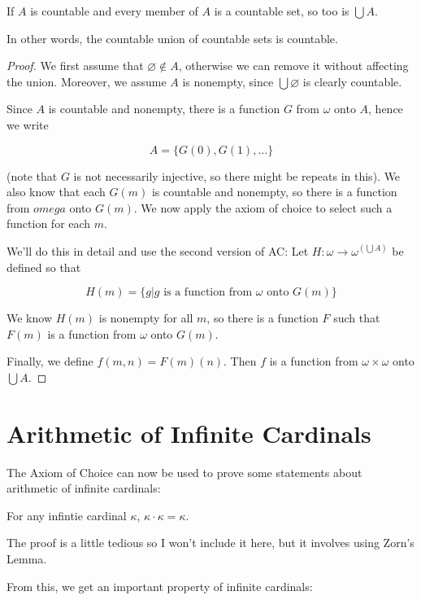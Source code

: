 \begin{theorem}
    If $A$ is countable and every member of $A$ is a countable set, so too is $\bigcup A$.

    In other words, the countable union of countable sets is countable. 
\end{theorem}

\begin{proof}
    We first assume that $\varnothing \notin A$, otherwise we can remove it without affecting the union. Moreover, we assume $A$ is nonempty, since $\bigcup \varnothing$ is clearly countable. 

    Since $A$ is countable and nonempty, there is a function $G$ from $\omega$ onto $A$, hence we write 

    \[A = \{G(0), G(1), \ldots\}\]

    (note that $G$ is not necessarily injective, so there might be repeats in this). We also know that each $G(m)$ is countable and nonempty, so there is a function from $omega$ onto $G(m)$. We now apply the axiom of choice to select such a function for each $m$. 

    We'll do this in detail and use the second version of AC: Let $H: \omega \to \omega^{\left(\bigcup A\right)}$ be defined so that 

    \[H(m) = \{g | g \text{ is a function from $\omega$ onto $G(m)$}\}\]

    We know $H(m)$ is nonempty for all $m$, so there is a function $F$ such that $F(m)$ is a function from $\omega$ onto $G(m)$.

    Finally, we define $f(m,n) = F(m)(n)$. Then $f$ is a function from $\omega \times \omega$ onto $\bigcup A$. 
\end{proof}

\section{Arithmetic of Infinite Cardinals}

The Axiom of Choice can now be used to prove some statements about arithmetic of infinite cardinals:

\begin{lemma}
    For any infintie cardinal $\kappa$, $\kappa \cdot \kappa = \kappa$. 
\end{lemma}

The proof is a little tedious so I won't include it here, but it involves using Zorn's Lemma. 

From this, we get an important property of infinite cardinals:

